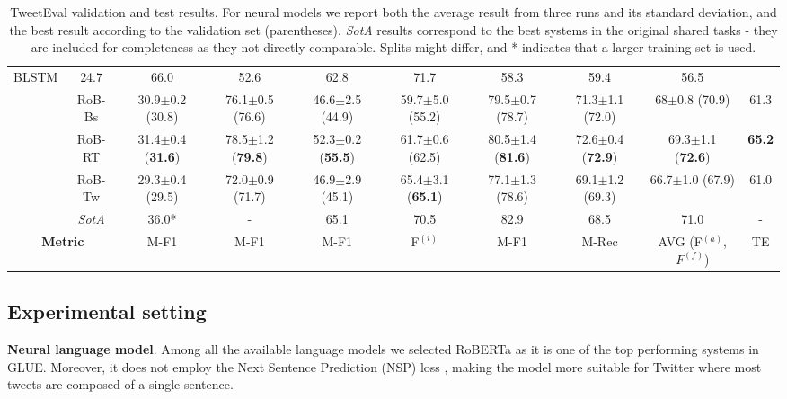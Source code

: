 \documentclass[11pt,a4paper]{article}
\begin{document}
\begin{table*}
{\begin{tabular}{cc|c|c|c|c|c|c|c||c}
  BLSTM &
  24.7 &
  66.0 &
  52.6 &
  62.8 &
  71.7 &
  58.3 &
  59.4 &
  56.5  \\
\multicolumn{1}{c|}{} &
  RoB-Bs &
  30.9{\small $\pm$0.2} (30.8) &
  76.1{\small $\pm$0.5} (76.6) &
  46.6{\small $\pm$2.5} (44.9) &
  59.7{\small $\pm$5.0} (55.2) &
  79.5{\small $\pm$0.7} (78.7) &
  71.3{\small $\pm$1.1} (72.0) &
  68{\small $\pm$0.8} (70.9) &
  61.3 \\
\multicolumn{1}{c|}{} &
  RoB-RT &
  31.4{\small $\pm$0.4} (\textbf{31.6}) &
  78.5{\small $\pm$1.2} (\textbf{79.8}) &
  52.3{\small $\pm$0.2} (\textbf{55.5}) &
  61.7{\small $\pm$0.6} (62.5) &
  80.5{\small $\pm$1.4} (\textbf{81.6}) &
  72.6{\small $\pm$0.4} (\textbf{72.9}) &
  69.3{\small $\pm$1.1} (\textbf{72.6}) &
  \textbf{65.2} \\
\multicolumn{1}{c|}{} &
  RoB-Tw &
  29.3{\small $\pm$0.4} (29.5) &
  72.0{\small $\pm$0.9} (71.7) &
  46.9{\small $\pm$2.9} (45.1) &
  65.4{\small $\pm$3.1} (\textbf{65.1}) &
  77.1{\small $\pm$1.3} (78.6) &
  69.1{\small $\pm$1.2} (69.3) &
  66.7{\small $\pm$1.0} (67.9) &
  61.0 \\ \cline{2-10} 
\multicolumn{1}{c|}{} &
  \textit{SotA} &
  36.0* &
  - &
  65.1 &
  70.5 &
  82.9 &
  68.5 &
  71.0 &
  - \\ \hline \hline
\multicolumn{2}{c|}{\textbf{Metric}} &
  M-F1 &
  M-F1 &
  M-F1 &
  F$^{(i)}$ &
  M-F1 &
  M-Rec &
  AVG (F$^{(a)}$,$F^{(f)}$) & TE
   \\ \bottomrule
\end{tabular}
}
\caption{\label{table-results} TweetEval validation and test results. For neural models we report both the average result from three runs and its standard deviation, and the best result according to the validation set (parentheses). \textit{SotA} results correspond to the best systems in the original shared tasks - they are included for completeness as they not directly comparable.  Splits might differ, and * indicates that a larger training set is used.}
\end{table*}


\subsection{Experimental setting}

\textbf{Neural language model}.
Among all the available language models we selected RoBERTa \cite{liu2019roberta} as it is one of the top performing systems in GLUE. Moreover, it does not employ the Next Sentence Prediction (NSP) loss \cite{devlin2018bert}, making the model more suitable for Twitter where most tweets are composed of a single sentence. 
\end{document}
